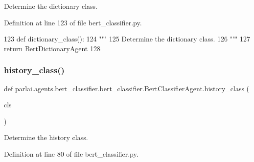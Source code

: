 \begin{DoxyVerb}Determine the dictionary class.
\end{DoxyVerb}
 

Definition at line 123 of file bert\+\_\+classifier.\+py.


\begin{DoxyCode}
123     \textcolor{keyword}{def }dictionary\_class():
124         \textcolor{stringliteral}{"""}
125 \textcolor{stringliteral}{        Determine the dictionary class.}
126 \textcolor{stringliteral}{        """}
127         \textcolor{keywordflow}{return} BertDictionaryAgent
128 
\end{DoxyCode}
\mbox{\label{classparlai_1_1agents_1_1bert__classifier_1_1bert__classifier_1_1BertClassifierAgent_ad606525729dd0340fc98a0bb50e24187}} 
\subsubsection{\texorpdfstring{history\+\_\+class()}{history\_class()}}
{\footnotesize\ttfamily def parlai.\+agents.\+bert\+\_\+classifier.\+bert\+\_\+classifier.\+Bert\+Classifier\+Agent.\+history\+\_\+class (\begin{DoxyParamCaption}\item[{}]{cls }\end{DoxyParamCaption})}

\begin{DoxyVerb}Determine the history class.
\end{DoxyVerb}
 

Definition at line 80 of file bert\+\_\+classifier.\+py.


